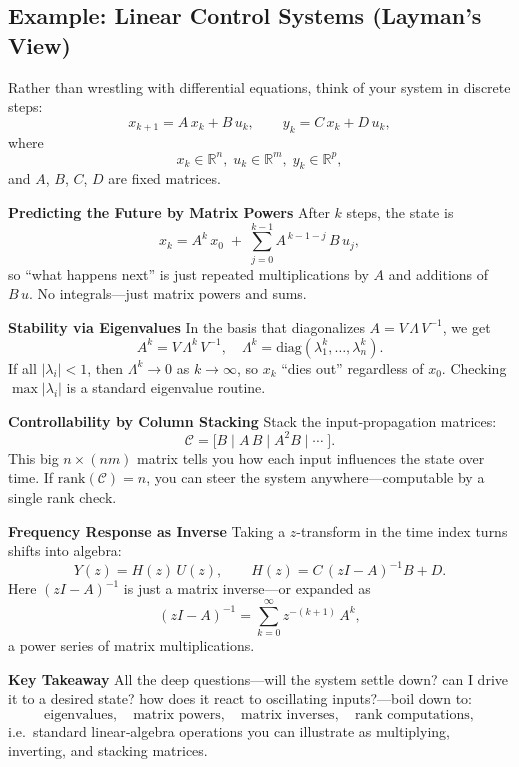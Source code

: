 \subsection{Example: Linear Control Systems (Layman’s View)}  

Rather than wrestling with differential equations, think of your system in discrete steps:
\[
x_{k+1} = A\,x_k + B\,u_k,
\qquad
y_k = C\,x_k + D\,u_k,
\]
where
\[
x_k\in\mathbb{R}^n,\;
u_k\in\mathbb{R}^m,\;
y_k\in\mathbb{R}^p,
\]
and \(A\), \(B\), \(C\), \(D\) are fixed matrices.  

\medskip

\noindent\textbf{Predicting the Future by Matrix Powers}  
After \(k\) steps, the state is
\[
x_k
= A^k\,x_0
\;+\;\sum_{j=0}^{k-1}A^{\,k-1-j}\,B\,u_j,
\]
so “what happens next” is just repeated multiplications by \(A\) and additions of \(B\,u\).  No integrals—just matrix powers and sums.

\medskip

\noindent\textbf{Stability via Eigenvalues}  
In the basis that diagonalizes \(A = V\,\Lambda\,V^{-1}\), we get
\[
A^k = V\,\Lambda^k\,V^{-1},
\quad
\Lambda^k = \mathrm{diag}(\lambda_1^k,\dots,\lambda_n^k).
\]
If all \(|\lambda_i|<1\), then \(\Lambda^k\to0\) as \(k\to\infty\), so \(x_k\) “dies out” regardless of \(x_0\).  Checking \(\max|\lambda_i|\) is a standard eigenvalue routine.

\medskip

\noindent\textbf{Controllability by Column Stacking}  
Stack the input‐propagation matrices:
\[
\mathcal C
= \bigl[B \;\big|\; A\,B \;\big|\; A^2B \;\big|\;\cdots\;\bigr].
\]
This big \(n\times(nm)\) matrix tells you how each input influences the state over time.  If \(\mathrm{rank}(\mathcal C)=n\), you can steer the system anywhere—computable by a single rank check.

\medskip

\noindent\textbf{Frequency Response as Inverse}  
Taking a \(z\)-transform in the time index turns shifts into algebra:
\[
Y(z) = H(z)\,U(z),
\qquad
H(z) = C\,(zI - A)^{-1}B + D.
\]
Here \((zI - A)^{-1}\) is just a matrix inverse—or expanded as
\[
(zI - A)^{-1}
= \sum_{k=0}^\infty z^{-(k+1)}\,A^k,
\]
a power series of matrix multiplications.

\medskip

\noindent\textbf{Key Takeaway}  
All the deep questions—will the system settle down? can I drive it to a desired state? how does it react to oscillating inputs?—boil down to:
\[
\text{eigenvalues},\quad
\text{matrix powers},\quad
\text{matrix inverses},\quad
\text{rank computations},
\]
i.e.\ standard linear‐algebra operations you can illustrate as multiplying, inverting, and stacking matrices.  
















